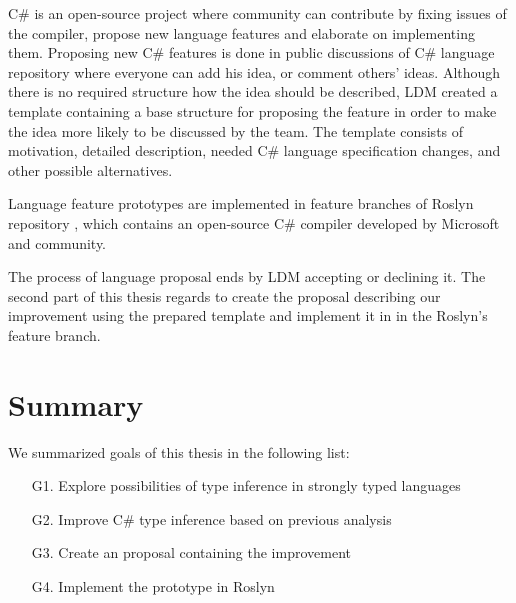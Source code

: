 C\# is an open-source project where community can contribute by fixing issues of the compiler, propose new language features and elaborate on implementing them.
Proposing new C\# features is done in public discussions of C\# language repository \cite{online:langRepo} where everyone can add his idea, or comment others' ideas.
Although there is no required structure how the idea should be described, \ac{LDM} created a template \cite{online:proposalTemplate} containing a base structure for proposing the feature in order to make the idea more likely to be discussed by the team.
The template consists of motivation, detailed description, needed C\# language specification \citep{online:langSpec} changes, and other possible alternatives.
\par
{}
Language feature prototypes are implemented in feature branches of Roslyn repository \cite{online:roslynRepo}, which contains an open-source C\# compiler developed by Microsoft and community.
\par
{}
The process of language proposal ends by \ac{LDM} accepting or declining it.
The second part of this thesis regards to create the proposal describing our improvement using the prepared template and implement it in in the Roslyn's feature branch.
\par

\section{Summary}

We summarized goals of this thesis in the following list:

\begin{enumerate}
  \item[G1.] Explore possibilities of type inference in strongly typed languages
  \item[G2.] Improve C\# type inference based on previous analysis
  \item[G3.] Create an proposal containing the improvement
  \item[G4.] Implement the prototype in Roslyn
\end{enumerate}